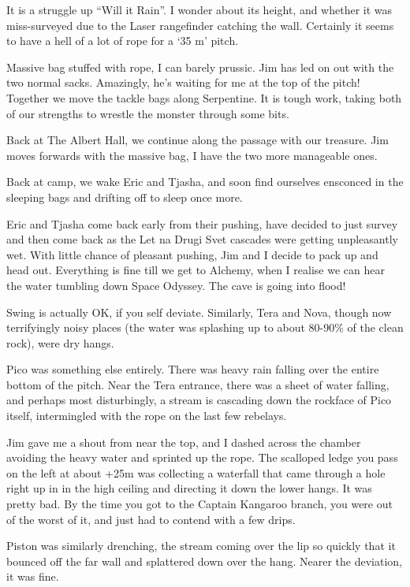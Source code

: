 It is a struggle up ``Will it Rain''. I wonder about its height, and
whether it was miss-surveyed due to the Laser rangefinder catching the
wall. Certainly it seems to have a hell of a lot of rope for a `35 m'
pitch.

Massive bag stuffed with rope, I can barely prussic. Jim has led on out
with the two normal sacks. Amazingly, he's waiting for me at the top of
the pitch! Together we move the tackle bags along Serpentine. It is
tough work, taking both of our strengths to wrestle the monster through
some bits.

Back at The Albert Hall, we continue along the passage with our
treasure. Jim moves forwards with the massive bag, I have the two more
manageable ones.

Back at camp, we wake Eric and Tjasha, and soon find ourselves ensconced
in the sleeping bags and drifting off to sleep once more.

Eric and Tjasha come back early from their pushing, have decided to just
survey and then come back as the Let na Drugi Svet cascades were getting
unpleasantly wet. With little chance of pleasant pushing, Jim and I
decide to pack up and head out. Everything is fine till we get to
Alchemy, when I realise we can hear the water tumbling down Space
Odyssey. The cave is going into flood!

Swing is actually OK, if you self deviate. Similarly, Tera and Nova,
though now terrifyingly noisy places (the water was splashing up to
about 80-90\% of the clean rock), were dry hangs.

Pico was something else entirely. There was heavy rain falling over the
entire bottom of the pitch. Near the Tera entrance, there was a sheet of
water falling, and perhaps most disturbingly, a stream is cascading down
the rockface of Pico itself, intermingled with the rope on the last few
rebelays.

Jim gave me a shout from near the top, and I dashed across the chamber
avoiding the heavy water and sprinted up the rope. The scalloped ledge
you pass on the left at about +25m was collecting a waterfall that came
through a hole right up in in the high ceiling and directing it down the
lower hangs. It was pretty bad. By the time you got to the Captain
Kangaroo branch, you were out of the worst of it, and just had to
contend with a few drips.

Piston was similarly drenching, the stream coming over the lip so
quickly that it bounced off the far wall and splattered down over the
hang. Nearer the deviation, it was fine.

